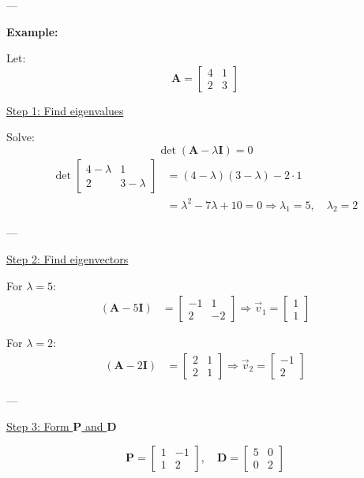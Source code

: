 ---

\textbf{Example:}

Let:
\[
\textbf{A} = 
\begin{bmatrix}
4 & 1 \\
2 & 3
\end{bmatrix}
\]

\underline{Step 1: Find eigenvalues}

Solve:
\[
\det(\textbf{A} - \lambda \textbf{I}) = 0
\]
\begin{align*}
\det
\begin{bmatrix}
4 - \lambda & 1 \\
2 & 3 - \lambda
\end{bmatrix}
&= (4 - \lambda)(3 - \lambda) - 2 \cdot 1 \\
&= \lambda^2 - 7\lambda + 10 = 0 \Rightarrow \lambda_1 = 5, \quad \lambda_2 = 2
\end{align*}

---

\underline{Step 2: Find eigenvectors}

For \(\lambda = 5\):
\begin{align*}
(\textbf{A} - 5\textbf{I}) &= 
\begin{bmatrix}
-1 & 1 \\
2 & -2
\end{bmatrix}
\Rightarrow \vec{v}_1 = 
\begin{bmatrix}
1 \\
1
\end{bmatrix}
\end{align*}

For \(\lambda = 2\):
\begin{align*}
(\textbf{A} - 2\textbf{I}) &= 
\begin{bmatrix}
2 & 1 \\
2 & 1
\end{bmatrix}
\Rightarrow \vec{v}_2 = 
\begin{bmatrix}
-1 \\
2
\end{bmatrix}
\end{align*}

---

\underline{Step 3: Form \(\textbf{P}\) and \(\textbf{D}\)}

\[
\textbf{P} = 
\begin{bmatrix}
1 & -1 \\
1 & 2
\end{bmatrix}, \quad
\textbf{D} = 
\begin{bmatrix}
5 & 0 \\
0 & 2
\end{bmatrix}
\]

